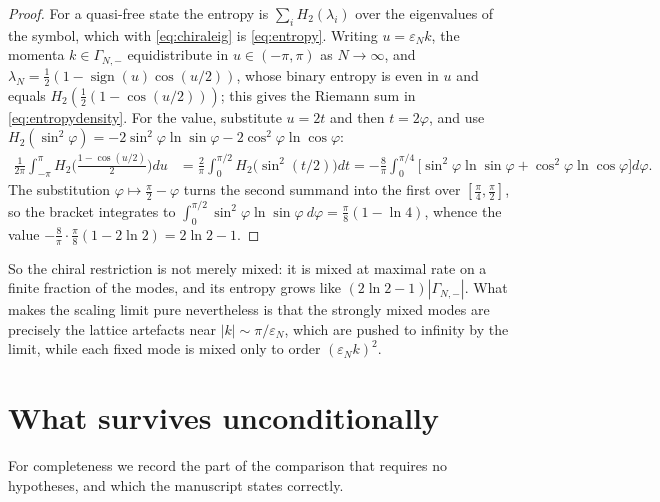 \documentclass[11pt,a4paper]{article}
\theoremstyle{definition}
\newcommand{\vep}{\varepsilon}
\newcommand{\1}{\mathds{1}}
\newcommand{\sign}{\operatorname{sign}}
\newcommand{\Gam}{\Gamma}
\begin{document}
\begin{proof}
For a quasi-free state the entropy is $\sum_{i}H_{2}(\lambda_{i})$ over the eigenvalues of the
symbol, which with \eqref{eq:chiraleig} is \eqref{eq:entropy}. Writing $u=\vep_{N}k$, the momenta
$k\in\Gam_{N,-}$ equidistribute in $u\in(-\pi,\pi)$ as $N\rightarrow\infty$, and
$\lambda_{N}=\tfrac{1}{2}(1-\sign(u)\cos(u/2))$, whose binary entropy is even in $u$ and equals
$H_{2}(\tfrac{1}{2}(1-\cos(u/2)))$; this gives the Riemann sum in \eqref{eq:entropydensity}. For the
value, substitute $u=2t$ and then $t=2\varphi$, and use
$H_{2}(\sin^{2}\varphi)=-2\sin^{2}\varphi\ln\sin\varphi-2\cos^{2}\varphi\ln\cos\varphi$:
\begin{align*}
\frac{1}{2\pi}\int_{-\pi}^{\pi}\!H_{2}\Big(\frac{1-\cos(u/2)}{2}\Big)du
 & = \frac{2}{\pi}\int_{0}^{\pi/2}\!H_{2}\big(\sin^{2}(t/2)\big)dt
 = -\frac{8}{\pi}\int_{0}^{\pi/4}\!\big[\sin^{2}\!\varphi\ln\sin\varphi
 +\cos^{2}\!\varphi\ln\cos\varphi\big]d\varphi.
\end{align*}
The substitution $\varphi\mapsto\tfrac{\pi}{2}-\varphi$ turns the second summand into the first over
$[\tfrac{\pi}{4},\tfrac{\pi}{2}]$, so the bracket integrates to
$\int_{0}^{\pi/2}\sin^{2}\!\varphi\ln\sin\varphi\!\ d\varphi=\tfrac{\pi}{8}(1-\ln4)$, whence the
value $-\tfrac{8}{\pi}\cdot\tfrac{\pi}{8}(1-2\ln2)=2\ln2-1$.
\end{proof}

So the chiral restriction is not merely mixed: it is mixed at maximal rate on a finite fraction of
the modes, and its entropy grows like $(2\ln2-1)|\Gam_{N,-}|$. What makes the scaling limit pure
nevertheless is that the strongly mixed modes are precisely the lattice artefacts near
$|k|\sim\pi/\vep_{N}$, which are pushed to infinity by the limit, while each fixed mode is mixed only
to order $(\vep_{N}k)^{2}$.

\section{What survives unconditionally}
\label{sec:survives}

For completeness we record the part of the comparison that requires no hypotheses, and which the
manuscript states correctly.
\end{document}
